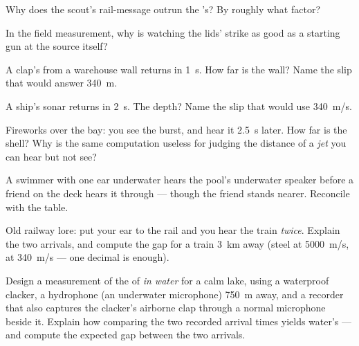 \begin{exercise}[$\star$]\label{exo:g7:sound-production:5}
Why does the scout's rail-message outrun the 's? By roughly
what factor?
\end{exercise}

\begin{exercise}[$\star$]\label{exo:g7:sound-production:6}
In the field measurement, why is watching the lids' strike as
good as a starting gun at the source itself?
\end{exercise}

\begin{exercise}[$\star$]\label{exo:g7:sound-production:7}
A clap's  from a warehouse wall returns in \qty{1}{s}. How
far is the wall? Name the slip that would answer
\qty{340}{m}.
\end{exercise}

\begin{exercise}[$\star$]\label{exo:g7:sound-production:8}
A ship's sonar  returns in \qty{2}{s}. The depth? Name the
slip that would use \qty{340}{m/s}.
\end{exercise}

\begin{exercise}[$\star\star$]\label{exo:g7:sound-production:9}
Fireworks over the bay: you see the burst, and hear it
\qty{2.5}{s} later. How far is the shell? Why is the same
computation useless for judging the distance of a \emph{jet}
you can hear but not see?
\end{exercise}

\begin{exercise}[$\star\star$]\label{exo:g7:sound-production:10}
A swimmer with one ear underwater hears the pool's underwater
speaker before a friend on the deck hears it through  ---
though the friend stands nearer. Reconcile with the table.
\end{exercise}

\begin{exercise}[$\star\star$]\label{exo:g7:sound-production:11}
Old railway lore: put your ear to the rail and you hear the
train \emph{twice}. Explain the two arrivals, and compute the
gap for a train \qty{3}{km} away (steel at \qty{5000}{m/s},
 at \qty{340}{m/s} --- one decimal is enough).
\end{exercise}

\begin{exercise}[$\star\star\star$]\label{exo:g7:sound-production:12}
Design a measurement of the  of  \emph{in water} for
a calm lake, using a waterproof clacker, a hydrophone (an
underwater microphone) \qty{750}{m} away, and a recorder that
also captures the clacker's airborne clap through a normal
microphone beside it. Explain how comparing the two recorded
arrival times yields water's  --- and compute the expected
gap between the two arrivals.
\end{exercise}

